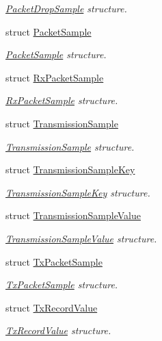 \begin{DoxyCompactItemize}
\begin{DoxyCompactList}\small\item\em \hyperlink{structns3_1_1PyViz_1_1PacketDropSample}{Packet\+Drop\+Sample} structure. \end{DoxyCompactList}\item 
struct \hyperlink{structns3_1_1PyViz_1_1PacketSample}{Packet\+Sample}
\begin{DoxyCompactList}\small\item\em \hyperlink{structns3_1_1PyViz_1_1PacketSample}{Packet\+Sample} structure. \end{DoxyCompactList}\item 
struct \hyperlink{structns3_1_1PyViz_1_1RxPacketSample}{Rx\+Packet\+Sample}
\begin{DoxyCompactList}\small\item\em \hyperlink{structns3_1_1PyViz_1_1RxPacketSample}{Rx\+Packet\+Sample} structure. \end{DoxyCompactList}\item 
struct \hyperlink{structns3_1_1PyViz_1_1TransmissionSample}{Transmission\+Sample}
\begin{DoxyCompactList}\small\item\em \hyperlink{structns3_1_1PyViz_1_1TransmissionSample}{Transmission\+Sample} structure. \end{DoxyCompactList}\item 
struct \hyperlink{structns3_1_1PyViz_1_1TransmissionSampleKey}{Transmission\+Sample\+Key}
\begin{DoxyCompactList}\small\item\em \hyperlink{structns3_1_1PyViz_1_1TransmissionSampleKey}{Transmission\+Sample\+Key} structure. \end{DoxyCompactList}\item 
struct \hyperlink{structns3_1_1PyViz_1_1TransmissionSampleValue}{Transmission\+Sample\+Value}
\begin{DoxyCompactList}\small\item\em \hyperlink{structns3_1_1PyViz_1_1TransmissionSampleValue}{Transmission\+Sample\+Value} structure. \end{DoxyCompactList}\item 
struct \hyperlink{structns3_1_1PyViz_1_1TxPacketSample}{Tx\+Packet\+Sample}
\begin{DoxyCompactList}\small\item\em \hyperlink{structns3_1_1PyViz_1_1TxPacketSample}{Tx\+Packet\+Sample} structure. \end{DoxyCompactList}\item 
struct \hyperlink{structns3_1_1PyViz_1_1TxRecordValue}{Tx\+Record\+Value}
\begin{DoxyCompactList}\small\item\em \hyperlink{structns3_1_1PyViz_1_1TxRecordValue}{Tx\+Record\+Value} structure. \end{DoxyCompactList}\end{DoxyCompactItemize}
